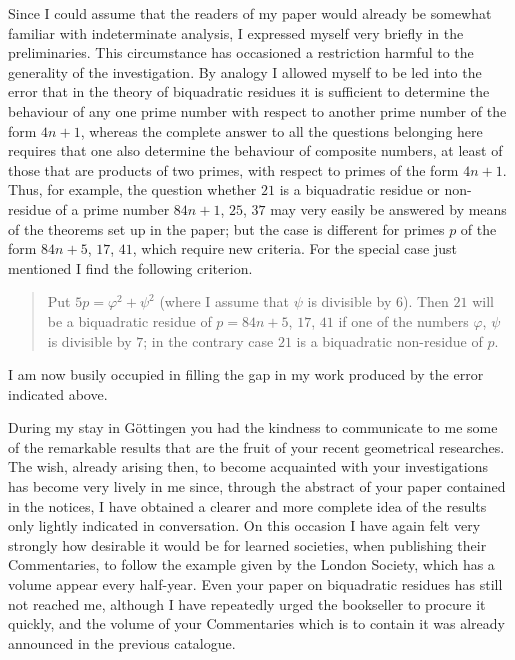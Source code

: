 \documentclass[11pt]{article}
\begin{document}
Since I could assume that the readers of my paper would already be somewhat familiar with indeterminate analysis, I expressed myself very briefly in the preliminaries. This circumstance has occasioned a restriction harmful to the generality of the investigation. By analogy I allowed myself to be led into the error that in the theory of biquadratic residues it is sufficient to determine the behaviour of any one prime number with respect to another prime number of the form $4n+1$, whereas the complete answer to all the questions belonging here requires that one also determine the behaviour of composite numbers, at least of those that are products of two primes, with respect to primes of the form $4n+1$. Thus, for example, the question whether $21$ is a biquadratic residue or non-residue of a prime number $84n+1$, $25$, $37$ may very easily be answered by means of the theorems set up in the paper; but the case is different for primes $p$ of the form $84n+5$, $17$, $41$, which require new criteria. For the special case just mentioned I find the following criterion.

\begin{quote}
Put $5p=\varphi^2+\psi^2$ (where I assume that $\psi$ is divisible by $6$). Then $21$ will be a biquadratic residue of $p=84n+5$, $17$, $41$ if one of the numbers $\varphi$, $\psi$ is divisible by $7$; in the contrary case $21$ is a biquadratic non-residue of $p$.
\end{quote}

I am now busily occupied in filling the gap in my work produced by the error indicated above.

During my stay in Göttingen you had the kindness to communicate to me some of the remarkable results that are the fruit of your recent geometrical researches. The wish, already arising then, to become acquainted with your investigations has become very lively in me since, through the abstract of your paper contained in the notices, I have obtained a clearer and more complete idea of the results only lightly indicated in conversation. On this occasion I have again felt very strongly how desirable it would be for learned societies, when publishing their Commentaries, to follow the example given by the London Society, which has a volume appear every half-year. Even your paper on biquadratic residues has still not reached me, although I have repeatedly urged the bookseller to procure it quickly, and the volume of your Commentaries which is to contain it was already announced in the previous catalogue.
\end{document}
